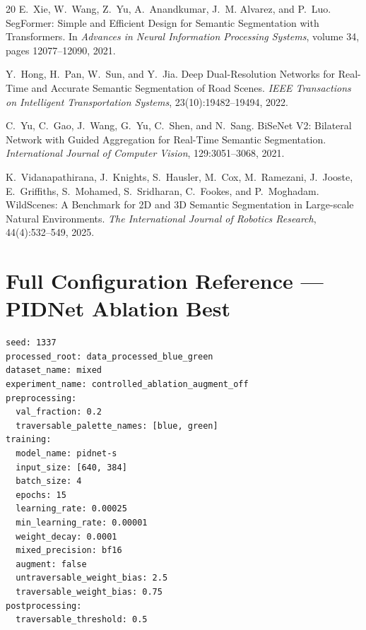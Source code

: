 \documentclass[12pt,a4paper]{report}
\begin{document}
\begin{thebibliography}{20}
E.~Xie, W.~Wang, Z.~Yu, A.~Anandkumar, J.~M. Alvarez, and P.~Luo.
\newblock SegFormer: Simple and Efficient Design for Semantic Segmentation with Transformers.
\newblock In \emph{Advances in Neural Information Processing Systems}, volume
34, pages 12077--12090, 2021.

Y.~Hong, H.~Pan, W.~Sun, and Y.~Jia.
\newblock Deep Dual-Resolution Networks for Real-Time and Accurate Semantic
Segmentation of Road Scenes.
\newblock \emph{IEEE Transactions on Intelligent Transportation Systems},
23(10):19482--19494, 2022.

C.~Yu, C.~Gao, J.~Wang, G.~Yu, C.~Shen, and N.~Sang.
\newblock BiSeNet V2: Bilateral Network with Guided Aggregation for Real-Time
Semantic Segmentation.
\newblock \emph{International Journal of Computer Vision}, 129:3051--3068, 2021.

K.~Vidanapathirana, J.~Knights, S.~Hausler, M.~Cox, M.~Ramezani,
J.~Jooste, E.~Griffiths, S.~Mohamed, S.~Sridharan, C.~Fookes, and
P.~Moghadam.
\newblock WildScenes: A Benchmark for 2D and 3D Semantic Segmentation in
Large-scale Natural Environments.
\newblock \emph{The International Journal of Robotics Research},
44(4):532--549, 2025.

\end{thebibliography}


\appendix
\chapter{Full Configuration Reference --- PIDNet Ablation Best}
\label{app:config}

\begin{verbatim}
seed: 1337
processed_root: data_processed_blue_green
dataset_name: mixed
experiment_name: controlled_ablation_augment_off
preprocessing:
  val_fraction: 0.2
  traversable_palette_names: [blue, green]
training:
  model_name: pidnet-s
  input_size: [640, 384]
  batch_size: 4
  epochs: 15
  learning_rate: 0.00025
  min_learning_rate: 0.00001
  weight_decay: 0.0001
  mixed_precision: bf16
  augment: false
  untraversable_weight_bias: 2.5
  traversable_weight_bias: 0.75
postprocessing:
  traversable_threshold: 0.5
\end{verbatim}
\end{document}
